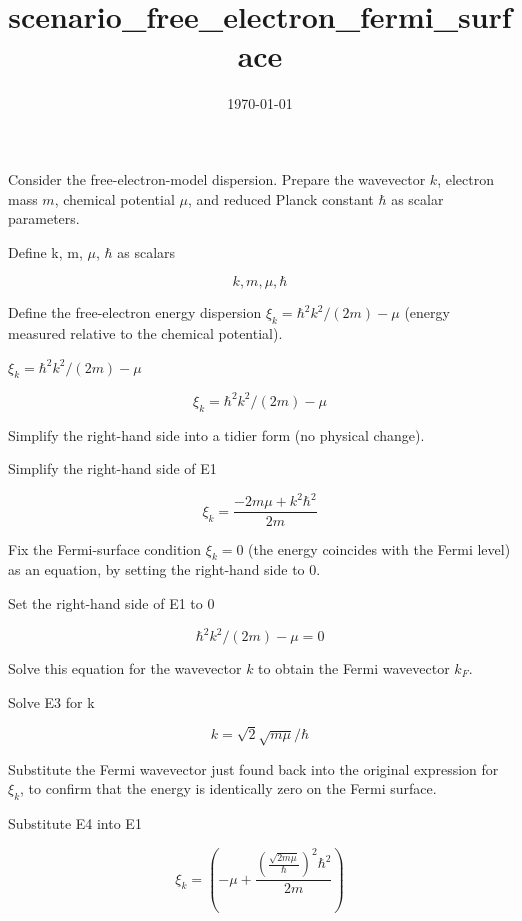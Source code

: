 \documentclass[dvipdfmx]{article}
\title{scenario\_free\_electron\_fermi\_surface}
\date{\today}
\begin{document}
\maketitle

Consider the free-electron-model dispersion. Prepare the wavevector $k$, electron mass $m$, chemical potential $\mu$, and reduced Planck constant $\hbar$ as scalar parameters.

Define k, m, $\mu$, $\hbar$ as scalars

\[
  k, m, \mu, \hbar
\]

Define the free-electron energy dispersion $\xi_k=\hbar^2k^2/(2m)-\mu$ (energy measured relative to the chemical potential).

$\xi_k = \hbar^2 k^2 / (2 m) - \mu$

\begin{equation}
  \xi_k = \hbar^2 k^2 / (2 m) - \mu
  \label{eq:E1}
\end{equation}

Simplify the right-hand side into a tidier form (no physical change).

Simplify the right-hand side of E1

\begin{equation}
  \xi_k = \frac{ - 2 m \mu + k^{2} \hbar^{2}}{2 m}
  \label{eq:E2}
\end{equation}

Fix the Fermi-surface condition $\xi_k=0$ (the energy coincides with the Fermi level) as an equation, by setting the right-hand side to 0.

Set the right-hand side of E1 to 0

\begin{equation}
  \hbar^2 k^2 / (2 m) - \mu = 0
  \label{eq:E3}
\end{equation}

Solve this equation for the wavevector $k$ to obtain the Fermi wavevector $k_F$.

Solve E3 for k

\begin{equation}
  k = \sqrt{2} \sqrt{m \mu}/\hbar
  \label{eq:E4}
\end{equation}

Substitute the Fermi wavevector just found back into the original expression for $\xi_k$, to confirm that the energy is identically zero on the Fermi surface.

Substitute E4 into E1

\begin{equation}
  \xi_k = \left( - \mu + \frac{\left( \frac{\sqrt{2 m \mu}}{\hbar} \right)^{2} \hbar^{2}}{2 m}\right)
  \label{eq:E5}
\end{equation}
\end{document}
